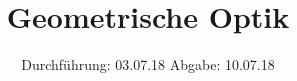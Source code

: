 

\subject{V408}
\title{Geometrische Optik}
\date{%
  Durchführung: 03.07.18
  \hspace{3em}
  Abgabe: 10.07.18
}



\maketitle
\thispagestyle{empty}
\tableofcontents
\newpage






\printbibliography{}


